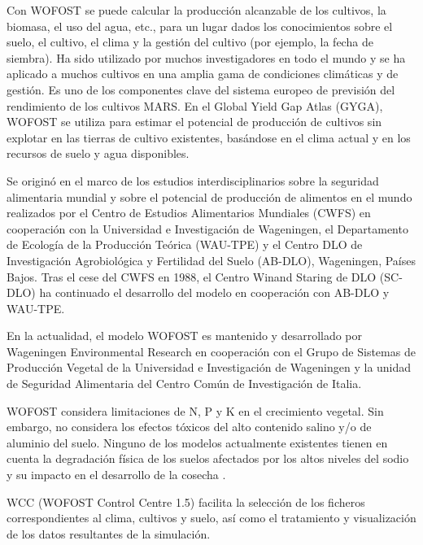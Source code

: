 Con WOFOST se puede calcular la producción alcanzable de los cultivos, la biomasa, el uso del agua, etc., para un lugar dados los conocimientos sobre el suelo, el cultivo, el clima y la gestión del cultivo (por ejemplo, la fecha de siembra). Ha sido utilizado por muchos investigadores en todo el mundo y se ha aplicado a muchos cultivos en una amplia gama de condiciones climáticas y de gestión. Es uno de los componentes clave del sistema europeo de previsión del rendimiento de los cultivos MARS. En el Global Yield Gap Atlas (GYGA), WOFOST se utiliza para estimar el potencial de producción de cultivos sin explotar en las tierras de cultivo existentes, basándose en el clima actual y en los recursos de suelo y agua disponibles.

Se originó en el marco de los estudios interdisciplinarios sobre la seguridad alimentaria mundial y sobre el potencial de producción de alimentos en el mundo realizados por el Centro de Estudios Alimentarios Mundiales (CWFS) en cooperación con la Universidad e Investigación de Wageningen, el Departamento de Ecología de la Producción Teórica (WAU-TPE) y el Centro DLO de Investigación Agrobiológica y Fertilidad del Suelo (AB-DLO), Wageningen, Países Bajos. Tras el cese del CWFS en 1988, el Centro Winand Staring de DLO (SC-DLO) ha continuado el desarrollo del modelo en cooperación con AB-DLO y WAU-TPE. 

En la actualidad, el modelo WOFOST es mantenido y desarrollado por Wageningen Environmental Research en cooperación con el Grupo de Sistemas de Producción Vegetal de la Universidad e Investigación de Wageningen y la unidad de Seguridad Alimentaria del Centro Común de Investigación de Italia. \parencite{form_wofost_2019}

WOFOST \parencite{van1989wofost} considera limitaciones de N, P y K en el crecimiento vegetal. Sin embargo, no considera los efectos tóxicos del alto contenido salino y/o de aluminio del suelo. Ninguno de los modelos actualmente existentes tienen en cuenta la degradación física de los suelos afectados por los altos niveles del sodio y su impacto en el desarrollo de la cosecha \parencite{de2005modeling}.

WCC (WOFOST Control Centre 1.5) facilita la selección de los ficheros correspondientes al clima, cultivos y suelo, así como el tratamiento y visualización de los datos resultantes de la simulación. \parencite{sebem2005aportaciones} \\


